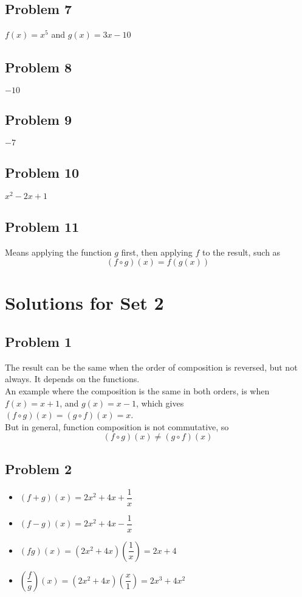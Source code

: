 \documentclass[12pt]{article}
\begin{document}
\subsection*{Problem 7}
\(f(x)=x^5\) and \(g(x)=3x-10\)
\subsection*{Problem 8}
\(-10\)
\subsection*{Problem 9}
\(-7\)
\subsection*{Problem 10}
\(x^2-2x+1\)
\subsection*{Problem 11}
Means applying the function \(g\) first, then applying \(f\) to the result, such as
\[(f \circ g)(x)=f(g(x))\]

\section*{Solutions for Set 2}
\subsection*{Problem 1}
The result can be the same when the order of composition is reversed, but not always. It depends on the functions.\\
An example where the composition is the same in both orders, is when \(f(x)=x+1\), and \(g(x)=x-1\), which gives \((f \circ g)(x)=(g \circ f)(x)=x\).\\
But in general, function composition is not commutative, so
\[(f \circ g)(x)\not= (g \circ f)(x)\]
\subsection*{Problem 2}
\begin{itemize}
    \item \( (f + g)(x) = 2x^2 + 4x + \dfrac{1}{x} \)
    \item \( (f - g)(x) = 2x^2 + 4x - \dfrac{1}{x} \)
    \item \( (fg)(x) = (2x^2 + 4x)\left(\dfrac{1}{x}\right) = 2x + 4 \)
    \item \( \left(\dfrac{f}{g}\right)(x) = (2x^2 + 4x)\left(\dfrac{x}{1}\right) = 2x^3 + 4x^2 \)
\end{itemize}
\end{document}
